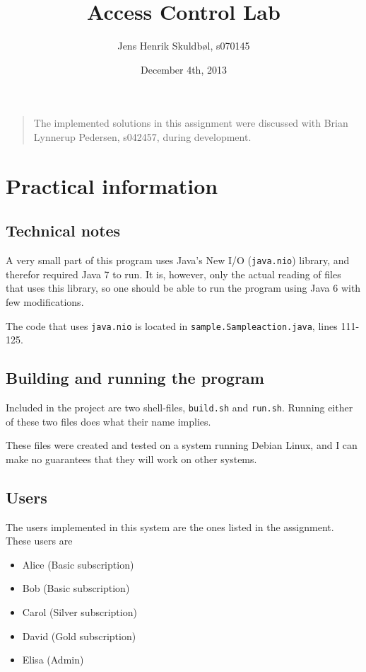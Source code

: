 \documentclass{article}
\title{Access Control Lab}
\author{Jens Henrik Skuldbøl, s070145}
\date{December 4th, 2013}
\begin{document}
\maketitle
\thispagestyle{empty}

\begin{quote}
	The implemented solutions in this assignment were discussed
	with Brian Lynnerup Pedersen, s042457, during development.
\end{quote}

\newpage

\section{Practical information}

\subsection{Technical notes}
A very small part of this program uses Java's New I/O
(\texttt{java.nio}) library, and therefor required Java 7
to run. It is, however, only the actual reading of files
that uses this library, so one should be able to run
the program using Java 6 with few modifications.

The code that uses \texttt{java.nio} is located in
\texttt{sample.Sampleaction.java}, lines 111-125.

\subsection{Building and running the program}
Included in the project are two shell-files, \texttt{build.sh}
and \texttt{run.sh}. Running either of these two files
does what their name implies.

These files were created and tested on a system running
Debian Linux, and I can make no guarantees that they
will work on other systems.

\subsection{Users}
The users implemented in this system are the ones listed
in the assignment. These users are
\begin{itemize}
	\item Alice (Basic subscription)
	\item Bob (Basic subscription)
	\item Carol (Silver subscription)
	\item David (Gold subscription)
	\item Elisa (Admin)
\end{itemize}
\end{document}
